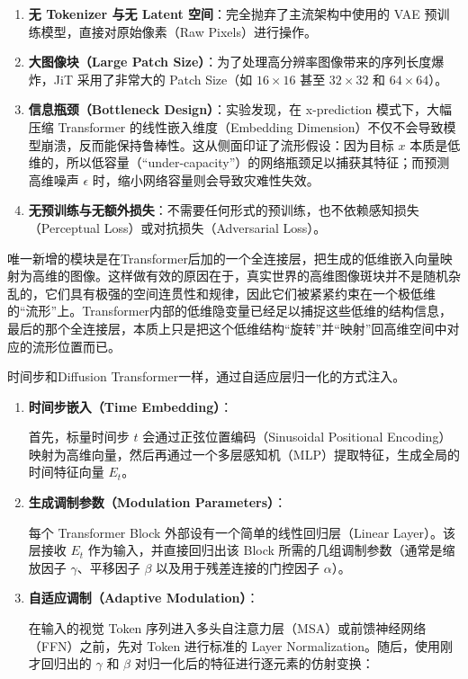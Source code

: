 \begin{enumerate}
\def\labelenumi{\arabic{enumi}.}
\tightlist
\item
  \textbf{无 Tokenizer 与无 Latent 空间}：完全抛弃了主流架构中使用的 VAE 预训练模型，直接对原始像素（Raw Pixels）进行操作。
\item
  \textbf{大图像块（Large Patch Size）}：为了处理高分辨率图像带来的序列长度爆炸，JiT 采用了非常大的 Patch Size（如 \(16\times16\) 甚至 \(32\times32\) 和 \(64\times64\)）。
\item
  \textbf{信息瓶颈（Bottleneck Design）}：实验发现，在 x-prediction 模式下，大幅压缩 Transformer 的线性嵌入维度（Embedding Dimension）不仅不会导致模型崩溃，反而能保持鲁棒性。这从侧面印证了流形假设：因为目标 \(x\) 本质是低维的，所以低容量（``under-capacity''）的网络瓶颈足以捕获其特征；而预测高维噪声 \(\epsilon\) 时，缩小网络容量则会导致灾难性失效。
\item
  \textbf{无预训练与无额外损失}：不需要任何形式的预训练，也不依赖感知损失（Perceptual Loss）或对抗损失（Adversarial Loss）。
\end{enumerate}

唯一新增的模块是在Transformer后加的一个全连接层，把生成的低维嵌入向量映射为高维的图像。这样做有效的原因在于，真实世界的高维图像斑块并不是随机杂乱的，它们具有极强的空间连贯性和规律，因此它们被紧紧约束在一个极低维的``流形''上。Transformer内部的低维隐变量已经足以捕捉这些低维的结构信息，最后的那个全连接层，本质上只是把这个低维结构``旋转''并``映射''回高维空间中对应的流形位置而已。

时间步和Diffusion Transformer一样，通过自适应层归一化的方式注入。

\begin{enumerate}
\def\labelenumi{\arabic{enumi}.}
\item
{}
  \textbf{时间步嵌入（Time Embedding）}：

  首先，标量时间步 \(t\) 会通过正弦位置编码（Sinusoidal Positional Encoding）映射为高维向量，然后再通过一个多层感知机（MLP）提取特征，生成全局的时间特征向量 \(E_t\)。
\item
{}
  \textbf{生成调制参数（Modulation Parameters）}：

  每个 Transformer Block 外部设有一个简单的线性回归层（Linear Layer）。该层接收 \(E_t\) 作为输入，并直接回归出该 Block 所需的几组调制参数（通常是缩放因子 \(\gamma\)、平移因子 \(\beta\) 以及用于残差连接的门控因子 \(\alpha\)）。
\item
{}
  \textbf{自适应调制（Adaptive Modulation）}：

  在输入的视觉 Token 序列进入多头自注意力层（MSA）或前馈神经网络（FFN）之前，先对 Token 进行标准的 Layer Normalization。随后，使用刚才回归出的 \(\gamma\) 和 \(\beta\) 对归一化后的特征进行逐元素的仿射变换：
\end{enumerate}

